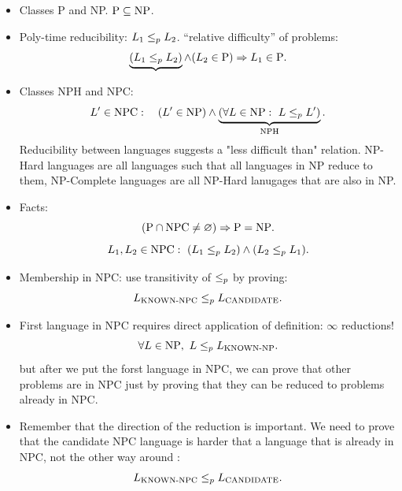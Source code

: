 \begin{itemize}
\item Classes P and NP. $\mathrm{P}\subseteq\mathrm{NP}$.
\item Poly-time reducibility: $L_1\leq_p L_2$. ``relative difficulty'' of problems:
\[
\underbrace{(L_1\leq_p L_2)}\land(L_2\in\mathrm{P})\Rightarrow L_1\in\mathrm{P}.
\]
\item Classes NPH and NPC:
\[
L'\in\mathrm{NPC}:\quad(L'\in\mathrm{NP})\land
\underbrace{(\forall L\in\mathrm{NP}:\ L\leq_p L')}_{\mathrm{NPH}}.
\]
Reducibility between languages suggests a "less difficult than" relation. 
NP-Hard languages are all languages such that all languages in NP reduce to them, NP-Complete languages are all NP-Hard lanugages that are also in NP.

\item Facts:
\[
(\mathrm{P}\cap\mathrm{NPC}\neq\varnothing)\Rightarrow\mathrm{P}=\mathrm{NP}.
\]
\[
L_1,L_2\in\mathrm{NPC}:\ (L_1\leq_p L_2)\land(L_2\leq_p L_1).
\]
\item Membership in NPC: use transitivity of $\leq_p$ by proving:
\[
L_{\mathrm{KNOWN\text{-}NPC}}\leq_p L_{\mathrm{CANDIDATE}}.
\] 


\item First language in NPC requires direct application of definition: $\infty$ reductions! \[ 
\forall L\in\classNP,\ L\polyred L_{\mathrm{KNOWN\text{-}NP}}.
\]
but after we put the forst language in NPC, we can prove that other problems are in NPC just by proving that they can be reduced to problems already in NPC.

\item Remember that the direction of the reduction is important. We need to prove that the candidate NPC language is harder that a language that is already in NPC, not the other way around : \[
L_{\mathrm{KNOWN\text{-}NPC}}\leq_p L_{\mathrm{CANDIDATE}}.
\]
\end{itemize}
